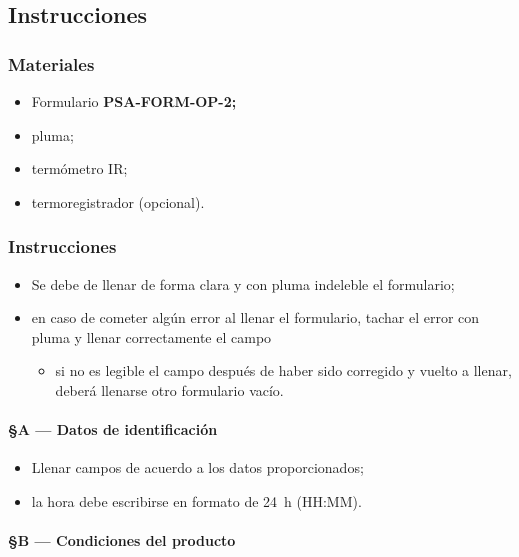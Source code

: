 \subsection{Instrucciones}

\subsubsection{Materiales}

\begin{itemize}
	\item Formulario \textbf{PSA-FORM-OP-2;}
	\item pluma;
	\item termómetro IR;\@
	\item termoregistrador (opcional).
\end{itemize}

\subsubsection{Instrucciones}

\begin{itemize}
	\item Se debe de llenar de forma clara y con pluma indeleble el formulario;
	\item en caso de cometer algún error al llenar el formulario, tachar el error con pluma y llenar correctamente el campo
	\begin{itemize}
		\item si no es legible el campo después de haber sido corregido y vuelto a llenar, deberá llenarse otro formulario vacío.
	\end{itemize}
\end{itemize}

\paragraph{§A --- Datos de identificación}

\begin{itemize}
	\item Llenar campos de acuerdo a los datos proporcionados;
	\item la hora debe escribirse en formato de \SI{24}{\hour} (HH:MM).
\end{itemize}

\paragraph{§B --- Condiciones del producto}

